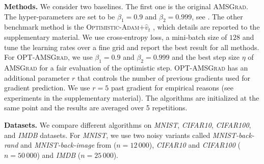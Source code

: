 \documentclass[11pt]{article}
\theoremstyle{k}
\begin{document}
\textbf{Methods.}
We consider two baselines. The first one is the original \textsc{AMSGrad}. 
The hyper-parameters are set to be $\beta_1 = 0.9$ and $\beta_2 = 0.999$, see \citep{RKK18}. 
The other benchmark method is the \textsc{Optimistic-Adam$+\hat{v}_t$} \citep{DISZ18}, which details are reported to the supplementary material. 
We use cross-entropy loss, a mini-batch size of $128$ and tune the learning rates over a fine grid and report the best result for all methods.
For \textsc{OPT-AMSGrad}, we use $\beta_1 = 0.9$ and $\beta_2 = 0.999$ and the best step size $\eta$ of \textsc{AMSGrad} for a fair evaluation of the optimistic step. 
\textsc{OPT-AMSGrad} has an additional parameter $r$ that controls the number of previous gradients used for gradient prediction. 
We use $r=5$ past gradient for empirical reasons (see experiments in the supplementary material).
The algorithms are initialized at the same point and the results are averaged over 5 repetitions.

\textbf{Datasets.}
We compare different algorithms on \textit{MNIST}, \textit{CIFAR10},
\textit{CIFAR100}, and \textit{IMDB} datasets. 
For \textit{MNIST}, we use two noisy variants called \textit{MNIST-back-rand} and \textit{MNIST-back-image} from \citep{MNIST07} ($n=12\,000$), \textit{CIFAR10} and \textit{CIFAR100} \citep{krizhevsky2009learning} ($n=50\,000$) and \textit{IMDB} \citep{IMDB11} ($n=25\,000$). 
\end{document}
